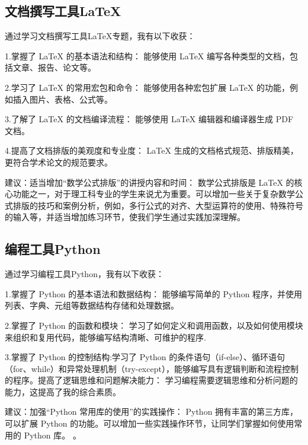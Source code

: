 \documentclass[supercite]{Experimental_Report}
\theoremstyle{definition}
\begin{document}
\subsection{文档撰写工具LaTeX}
通过学习文档撰写工具LaTeX专题，我有以下收获：


\par 1.掌握了 LaTeX 的基本语法和结构： 能够使用 LaTeX 编写各种类型的文档，包括文章、报告、论文等。
\par 2.学习了 LaTeX 的常用宏包和命令： 能够使用各种宏包扩展 LaTeX 的功能，例如插入图片、表格、公式等。
\par 3.了解了 LaTeX 的文档编译流程： 能够使用 LaTeX 编辑器和编译器生成 PDF 文档。
\par 4.提高了文档排版的美观度和专业度： LaTeX 生成的文档格式规范、排版精美，更符合学术论文的规范要求。


\par 建议：适当增加“数学公式排版”的讲授内容和时间： 数学公式排版是 LaTeX 的核心功能之一，对于理工科专业的学生来说尤为重要。可以增加一些关于复杂数学公式排版的技巧和案例分析，例如，多行公式的对齐、大型运算符的使用、特殊符号的输入等，并适当增加练习环节，使我们学生通过实践加深理解。


\subsection{编程工具Python}
通过学习编程工具Python，我有以下收获：
\par 1.掌握了 Python 的基本语法和数据结构： 能够编写简单的 Python 程序，并使用列表、字典、元组等数据结构存储和处理数据。
\par 2.掌握了 Python 的函数和模块： 学习了如何定义和调用函数，以及如何使用模块来组织和复用代码，能够编写结构清晰、可维护的程序.
\par 3.掌握了 Python 的控制结构:学习了 Python 的条件语句（if-else）、循环语句（for、while）和异常处理机制（try-except），能够编写具有逻辑判断和流程控制的程序。提高了逻辑思维和问题解决能力： 学习编程需要逻辑思维和分析问题的能力，这提高了我的综合素质。



\par 建议：加强“Python 常用库的使用”的实践操作： Python 拥有丰富的第三方库，可以扩展 Python 的功能。可以增加一些实践操作环节，让同学们掌握如何使用常用的 Python 库。
。
\end{document}
